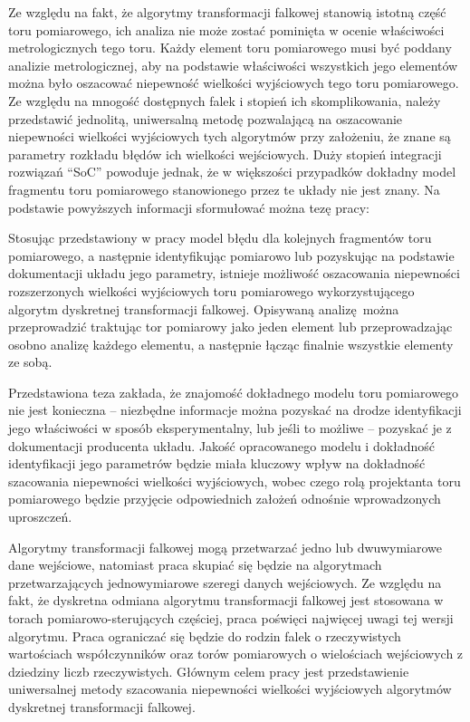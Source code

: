 Ze względu na fakt, że algorytmy transformacji falkowej stanowią istotną część toru pomiarowego, ich analiza nie może zostać pominięta w ocenie właściwości metrologicznych tego toru. Każdy element toru pomiarowego musi być poddany analizie metrologicznej, aby na podstawie właściwości wszystkich jego elementów można było oszacować niepewność wielkości wyjściowych tego toru pomiarowego. Ze względu na mnogość dostępnych falek i stopień ich skomplikowania, należy przedstawić jednolitą, uniwersalną metodę pozwalającą na oszacowanie niepewności wielkości wyjściowych tych algorytmów przy założeniu, że znane są parametry rozkładu błędów ich wielkości wejściowych. Duży stopień integracji rozwiązań \enquote{SoC} powoduje jednak, że w większości przypadków dokładny model fragmentu toru pomiarowego stanowionego przez te układy nie jest znany. Na podstawie powyższych informacji sformułować można tezę pracy:

\begin{quoting}[font = bfseries]
Stosując przedstawiony w pracy model błędu dla kolejnych fragmentów toru pomiarowego, a następnie identyfikując pomiarowo lub pozyskując na podstawie dokumentacji układu jego parametry, istnieje możliwość oszacowania niepewności rozszerzonych wielkości wyjściowych toru pomiarowego wykorzystującego algorytm dyskretnej transformacji falkowej. Opisywaną analizę można przeprowadzić traktując tor pomiarowy jako jeden element lub przeprowadzając osobno analizę każdego elementu, a następnie łącząc finalnie wszystkie elementy ze sobą.
\end{quoting}

Przedstawiona teza zakłada, że znajomość dokładnego modelu toru pomiarowego nie jest konieczna -- niezbędne informacje można pozyskać na drodze identyfikacji jego właściwości w sposób eksperymentalny, lub jeśli to możliwe -- pozyskać je z dokumentacji producenta układu. Jakość opracowanego modelu i dokładność identyfikacji jego parametrów będzie miała kluczowy wpływ na dokładność szacowania niepewności wielkości wyjściowych, wobec czego rolą projektanta toru pomiarowego będzie przyjęcie odpowiednich założeń odnośnie wprowadzonych uproszczeń.

Algorytmy transformacji falkowej mogą przetwarzać jedno lub dwuwymiarowe dane wejściowe, natomiast praca skupiać się będzie na algorytmach przetwarzających jednowymiarowe szeregi danych wejściowych. Ze względu na fakt, że dyskretna odmiana algorytmu transformacji falkowej jest stosowana w torach pomiarowo-sterujących częściej, praca poświęci najwięcej uwagi tej wersji algorytmu. Praca ograniczać się będzie do rodzin falek o rzeczywistych wartościach współczynników oraz torów pomiarowych o wielościach wejściowych z dziedziny liczb rzeczywistych. Głównym celem pracy jest przedstawienie uniwersalnej metody szacowania niepewności wielkości wyjściowych algorytmów dyskretnej transformacji falkowej.

